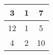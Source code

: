 \documentclass{standalone}
\begin{document}
	\begin{tabular}{|c|c|c|}
	\hline
		3  & 1 & 7  \\ \hline
		12 & 1 & 5  \\ \hline
		4  & 2 & 10 \\ \hline

\end{tabular}
\end{document}
